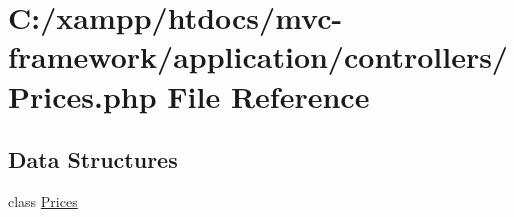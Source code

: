 \hypertarget{_prices_8php}{}\section{C\+:/xampp/htdocs/mvc-\/framework/application/controllers/\+Prices.php File Reference}
\label{_prices_8php}
\subsection*{Data Structures}
\begin{DoxyCompactItemize}
\item 
class \hyperlink{class_prices}{Prices}
\end{DoxyCompactItemize}
